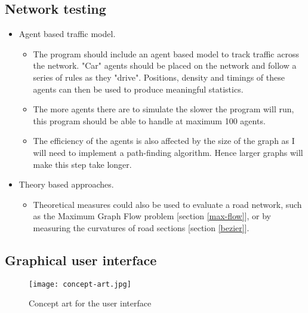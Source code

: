     \subsection{Network testing}
    \begin{itemize}
        \item Agent based traffic model.
        \begin{itemize}
            \item The program should include an agent based model to track traffic across the network. "Car" agents should be placed on the network and follow a series of rules as they "drive". Positions, density and timings of these agents can then be used to produce meaningful statistics.
            \item The more agents there are to simulate the slower the program will run, this program should be able to handle at maximum 100 agents.
            \item The efficiency of the agents is also affected by the size of the graph as I will need to implement a path-finding algorithm. Hence larger graphs will make this step take longer.
        \end{itemize}
        \item Theory based approaches.
        \begin{itemize}
            \item Theoretical measures could also be used to evaluate a road network, such as the Maximum Graph Flow problem [section \ref{max-flow}], or by measuring the curvatures of road sections [section \ref{bezier}].
        \end{itemize}
    \end{itemize}

    \subsection{Graphical user interface}
    \label{requirements-GUI}

    \begin{figure}[ht]
        \centering
        \texttt{[image: concept-art.jpg]}
        \caption{Concept art for the user interface}
    \end{figure}

